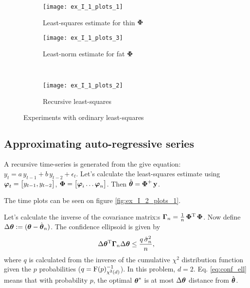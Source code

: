 \begin{figure}[H]
	\centering
	\begin{subfigure}[b]{.43\textwidth}
		\centering
		\texttt{[image: ex\_I\_1\_plots\_1]}
		\caption{Least-squares estimate for thin $\boldsymbol{\mathrm{\Phi}}$}
		\label{fig:ex_I_1_plots_1}
	\end{subfigure}\hfill
	\begin{subfigure}[b]{.43\textwidth}
		\centering
		\texttt{[image: ex\_I\_1\_plots\_3]}
		\caption{Least-norm estimate for fat $\boldsymbol{\mathrm{\Phi}}$}
		\label{fig:ex_I_1_plots_3}
	\end{subfigure}\\
	\begin{subfigure}[b]{.45\textwidth}
		\centering
		\vspace{6mm}
		\texttt{[image: ex\_I\_1\_plots\_2]}
		\caption{Recursive least-squares}
		\label{fig:ex_I_1_plots_2}
	\end{subfigure}
	\caption{Experiments with ordinary least-squares}
\end{figure}


\subsection{Approximating auto-regressive series}

A recursive time-series is generated from the give equation: $y_t = a\,y_{t-1} + b\,y_{t-2} + \epsilon_t$.
Let's calculate the least-squares estimate using $\boldsymbol{\mathrm{\varphi}}_t = \begin{bmatrix}y_{t-1}, y_{t-2}\end{bmatrix}$,
$\v{\Phi}=\mat{\v{\varphi}_i\dots\v{\varphi}_n}$.
Then $\hat{\boldsymbol{\mathrm{\theta}}} = \boldsymbol{\mathrm{\Phi}}^+\,\boldsymbol{\mathrm{y}}$.

The time plots can be seen on figure \ref{fig:ex_I_2_plots_1}.

Let's calculate the inverse of the covariance matrix:s
$\boldsymbol{\mathrm{\Gamma}}_n = \frac{1}{n}\,\boldsymbol{\mathrm{\Phi}}\textsuperscript{T}\,\boldsymbol{\mathrm{\Phi}}$.
Now define $\Delta\boldsymbol{\mathrm{\theta}} := (\boldsymbol{\mathrm{\theta}} - \hat{\boldsymbol{\mathrm{\theta}}}_n)$.
The confidence ellipsoid is given by 
\begin{equation}\label{eq:conf_ell}
	\Delta\boldsymbol{\mathrm{\theta}}\textsuperscript{T}\boldsymbol{\mathrm{\Gamma}}_n\Delta\boldsymbol{\mathrm{\theta}}\leq\frac{q\,\hat{\sigma}_n^2}{n},
\end{equation}
where $q$ is calculated from the inverse of the cumulative $\chi^2$ distribution function
given the $p$ probabilities ($q = \mathrm{F}(p)_{\chi^2(d)}^{-1}$).
In this problem, $d=2$.
Eq. \ref{eq:conf_ell} means that with probability $p$, the optimal $\boldsymbol{\mathrm{\theta}}^*$
is at most $\Delta\boldsymbol{\mathrm{\theta}}$ distance from $\hat{\boldsymbol{\mathrm{\theta}}}$.

